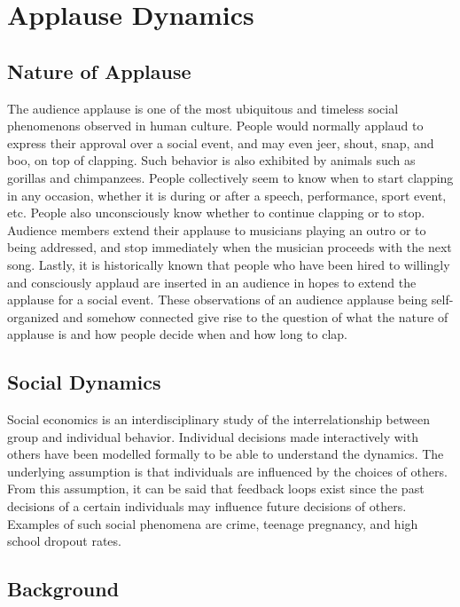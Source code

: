 \chapter{Applause Dynamics}

\section{Nature of Applause}

\hspace{\parindent} 
The audience applause is one of the most ubiquitous and timeless social phenomenons observed in human culture.
People would normally applaud to express their approval over a social event, and may even jeer, shout, snap, and boo, on top of clapping.
Such behavior is also exhibited by animals such as gorillas and chimpanzees.
People collectively seem to know when to start clapping in any occasion, whether it is during or after a speech, performance, sport event, etc.
People also unconsciously know whether to continue clapping or to stop. 
Audience members extend their applause to musicians playing an outro or to being addressed, and stop immediately when the musician proceeds with the next song.
Lastly, it is historically known that people who have been hired to willingly and consciously applaud are inserted in an audience in hopes to extend the applause for a social event.
These observations of an audience applause being self-organized and somehow connected give rise to the question of what the nature of applause is and how people decide when and how long to clap.

\section{Social Dynamics}
Social economics is an interdisciplinary study of the interrelationship between group and individual behavior. 
Individual decisions made interactively with others have been modelled formally to be able to understand the dynamics. 
The underlying assumption is that individuals are influenced by the choices of others. 
From this assumption, it can be said that feedback loops exist since the past decisions of a certain individuals may influence future decisions of others. Examples of such social phenomena are crime, teenage pregnancy, and high school dropout rates.\cite{socialDynamics}\cite{peerEffects}

\section{Background}
